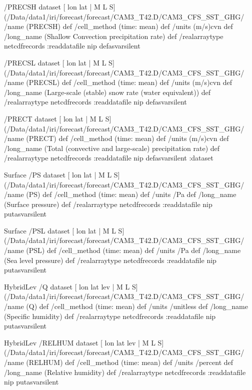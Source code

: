 \begin{ingrid}
/PRECSH{
dataset
[ lon lat | M L S] (/Data/data1/iri/forecast/forecast/CAM3_T42.D/CAM3_CFS_SST_GHG/%
/name (PRECSH) def
 /cell_method (time: mean) def
 /units (m/s)cvn def
 /long_name (Shallow Convection precipitation rate) def
 /realarraytype netcdfrecords :readdatafile
nip
}defasvarsilent

/PRECSL{
dataset
[ lon lat | M L S] (/Data/data1/iri/forecast/forecast/CAM3_T42.D/CAM3_CFS_SST_GHG/%
/name (PRECSL) def
 /cell_method (time: mean) def
 /units (m/s)cvn def
 /long_name (Large-scale (stable) snow rate (water equivalent)) def
 /realarraytype netcdfrecords :readdatafile
nip
}defasvarsilent

/PRECT{
dataset
[ lon lat | M L S] (/Data/data1/iri/forecast/forecast/CAM3_T42.D/CAM3_CFS_SST_GHG/%
/name (PRECT) def
 /cell_method (time: mean) def
 /units (m/s)cvn def
 /long_name (Total (convective and large-scale) precipitation rate) def
 /realarraytype netcdfrecords :readdatafile
nip
}defasvarsilent
:dataset


Surface /PS{
dataset
[ lon lat | M L S] (/Data/data1/iri/forecast/forecast/CAM3_T42.D/CAM3_CFS_SST_GHG/%
/name (PS) def
 /cell_method (time: mean) def
 /units /Pa def
 /long_name (Surface pressure) def
 /realarraytype netcdfrecords :readdatafile
nip
}putasvarsilent

Surface /PSL{
dataset
[ lon lat | M L S] (/Data/data1/iri/forecast/forecast/CAM3_T42.D/CAM3_CFS_SST_GHG/%
/name (PSL) def
 /cell_method (time: mean) def
 /units /Pa def
 /long_name (Sea level pressure) def
 /realarraytype netcdfrecords :readdatafile
nip
}putasvarsilent


HybridLev /Q{
dataset
[ lon lat lev | M L S] (/Data/data1/iri/forecast/forecast/CAM3_T42.D/CAM3_CFS_SST_GHG/%
/name (Q) def
 /cell_method (time: mean) def
 /units /unitless def
 /long_name (Specific humidity) def
 /realarraytype netcdfrecords :readdatafile
nip
}putasvarsilent

HybridLev /RELHUM{
dataset
[ lon lat lev | M L S] (/Data/data1/iri/forecast/forecast/CAM3_T42.D/CAM3_CFS_SST_GHG/%
/name (RELHUM) def
 /cell_method (time: mean) def
 /units /percent def
 /long_name (Relative humidity) def
 /realarraytype netcdfrecords :readdatafile
nip
}putasvarsilent



\end{ingrid}
